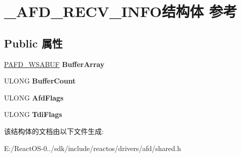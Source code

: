 \hypertarget{struct___a_f_d___r_e_c_v___i_n_f_o}{}\section{\+\_\+\+A\+F\+D\+\_\+\+R\+E\+C\+V\+\_\+\+I\+N\+F\+O结构体 参考}
\label{struct___a_f_d___r_e_c_v___i_n_f_o}
\subsection*{Public 属性}
\begin{DoxyCompactItemize}
\item 
\mbox{\label{struct___a_f_d___r_e_c_v___i_n_f_o_ad7a15e7a9bd13aec1dfcc927c49718c6}} 
\hyperlink{struct___a_f_d___w_s_a_b_u_f}{P\+A\+F\+D\+\_\+\+W\+S\+A\+B\+UF} {\bfseries Buffer\+Array}
\item 
\mbox{\label{struct___a_f_d___r_e_c_v___i_n_f_o_a2f681a048dafa89464b2a4187e02454e}} 
U\+L\+O\+NG {\bfseries Buffer\+Count}
\item 
\mbox{\label{struct___a_f_d___r_e_c_v___i_n_f_o_a7d648d8b9308833a96c13cc5273da7fc}} 
U\+L\+O\+NG {\bfseries Afd\+Flags}
\item 
\mbox{\label{struct___a_f_d___r_e_c_v___i_n_f_o_a5d9d72798b62cab72125bc01c4b36954}} 
U\+L\+O\+NG {\bfseries Tdi\+Flags}
\end{DoxyCompactItemize}


该结构体的文档由以下文件生成\+:\begin{DoxyCompactItemize}
\item 
E\+:/\+React\+O\+S-\/0../sdk/include/reactos/drivers/afd/shared.\+h\end{DoxyCompactItemize}
